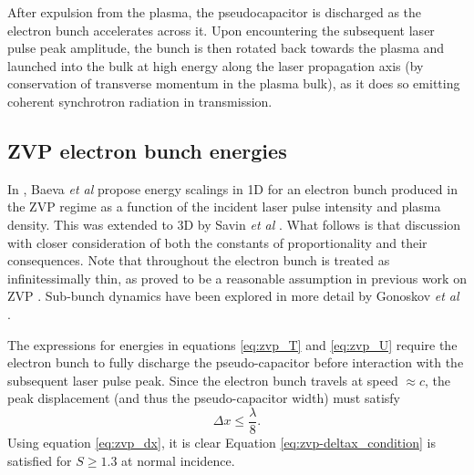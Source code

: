 After expulsion from the plasma, the pseudocapacitor is discharged as the electron bunch accelerates across it. Upon encountering the subsequent laser pulse peak amplitude, the bunch is then rotated back towards the plasma and launched into the bulk at high energy along the laser propagation axis (by conservation of transverse momentum in the plasma bulk), as it does so emitting coherent synchrotron radiation in transmission.

\subsection{ZVP electron bunch energies}\label{sec:zvp_energies_derivation}
In \cite{baevaZeroVectorPotential2011}, Baeva \textit{et al} propose energy scalings in \ac{1D} for an electron bunch produced in the \ac{ZVP} regime as a function of the incident laser pulse intensity and plasma density. This was extended to \ac{3D} by Savin \textit{et al} \cite{savinAttosecondscaleAbsorptionExtreme2017}. What follows is that discussion with closer consideration of both the constants of proportionality and their consequences. Note that throughout the electron bunch is treated as infinitessimally thin, as proved to be a reasonable assumption in previous work on ZVP \cite{baevaTheoryHighorderHarmonic2006, savinAttosecondscaleAbsorptionExtreme2017, savinEnergyAbsorptionLaserQED2019}. Sub-bunch dynamics have been explored in more detail by Gonoskov \textit{et al} \cite{gonoskovTheoryRelativisticRadiation2018}.

The expressions for energies in equations \ref{eq:zvp_T} and \ref{eq:zvp_U} require the electron bunch to fully discharge the pseudo-capacitor before interaction with the subsequent laser pulse peak. Since the electron bunch travels at speed $\approx c$, the peak displacement (and thus the pseudo-capacitor width) must satisfy
\begin{equation}\label{eq:zvp-deltax_condition}
	\Delta x \le \frac{\lambda}{8}.
\end{equation}
Using equation \ref{eq:zvp_dx}, it is clear Equation \ref{eq:zvp-deltax_condition} is satisfied for $ S\ge 1.3$ at normal incidence.

